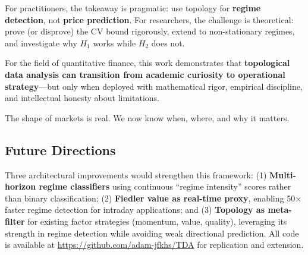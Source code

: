 For practitioners, the takeaway is pragmatic: use topology for \textbf{regime detection}, not \textbf{price prediction}. For researchers, the challenge is theoretical: prove (or disprove) the CV bound rigorously, extend to non-stationary regimes, and investigate why $H_1$ works while $H_2$ does not.

For the field of quantitative finance, this work demonstrates that \textbf{topological data analysis can transition from academic curiosity to operational strategy}---but only when deployed with mathematical rigor, empirical discipline, and intellectual honesty about limitations.

The shape of markets is real. We now know when, where, and why it matters.

\subsection{Future Directions}

Three architectural improvements would strengthen this framework: (1) \textbf{Multi-horizon regime classifiers} using continuous ``regime intensity'' scores rather than binary classification; (2) \textbf{Fiedler value as real-time proxy}, enabling 50$\times$ faster regime detection for intraday applications; and (3) \textbf{Topology as meta-filter} for existing factor strategies (momentum, value, quality), leveraging its strength in regime detection while avoiding weak directional prediction. All code is available at \url{https://github.com/adam-jfkhs/TDA} for replication and extension.
